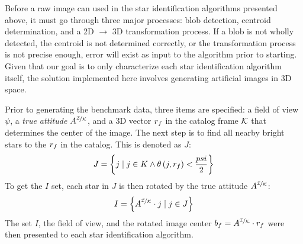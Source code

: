 Before a raw image can used in the star identification algorithms presented above, it must go through three major
processes: blob detection, centroid determination, and a 2D $\rightarrow$ 3D transformation process.
If a blob is not wholly detected, the centroid is not determined correctly, or the transformation process
is not precise enough, error will exist as input to the algorithm prior to starting.
Given that our goal is to only characterize each star identification algorithm itself, the solution implemented here
involves generating artificial images in 3D space.

Prior to generating the benchmark data, three items are specified: a field of view $\psi$, a \textit{true attitude}
$A^{\nicefrac{\mathcal{I}}{\mathcal{K}}}$, and a 3D vector $r_f$ in the catalog frame $\mathcal{K}$ that determines
the center of the image.
The next step is to find all nearby bright stars to the $r_f$ in the catalog.
This is denoted as $J$:
\begin{equation}
    J = \left\{  j \mid j \in K \land \theta\left( j, r_f \right) < \frac{psi}{2}  \right\}
\end{equation}
To get the $I$ set, each star in $J$ is then rotated by the true attitude $A^{\nicefrac{\mathcal{I}}{\mathcal{K}}}$:
\begin{equation}
    I = \left\{  A^{\nicefrac{\mathcal{I}}{\mathcal{K}}} \cdot j \mid j \in J  \right\}
\end{equation}
The set $I$, the field of view, and the rotated image center $b_f = A^{\nicefrac{\mathcal{I}}{\mathcal{K}}} \cdot r_f$
were then presented to each star identification algorithm.


